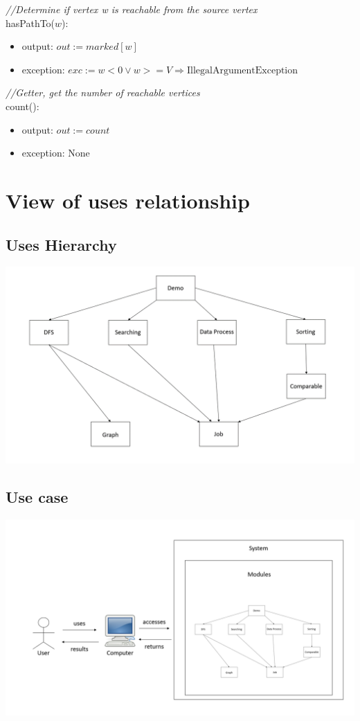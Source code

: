\documentclass[12pt]{article}
\begin{document}
\noindent \textit{//Determine if vertex w is reachable from the source vertex}\\
\noindent hasPathTo($w$):
\begin{itemize}
\item output: $out := marked[w]$
\item exception: $exc := w < 0 \lor w >= V \Rightarrow \mbox{IllegalArgumentException}$
\end{itemize}

\noindent \textit{//Getter, get the number of reachable vertices}\\
\noindent count():
\begin{itemize}
\item output: $out := count$
\item exception: None
\end{itemize}
\newpage

\section{View of uses relationship}
\subsection*{Uses Hierarchy}
\begin{center}
\includegraphics[scale = 0.5]{usesHierarchy.png}
\end{center}
\subsection*{Use case}
\begin{center}
\includegraphics[scale = 0.5]{useCase.png}
\end{center}
\newpage
\end{document}
